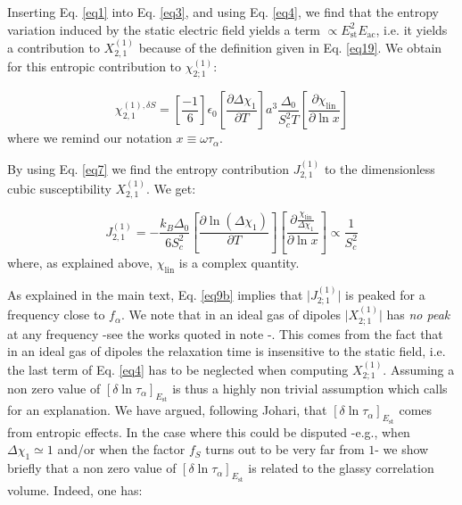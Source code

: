 \documentclass[single column,pre]{revtex4}
\begin{document}

Inserting Eq. \ref{eq1} into Eq. \ref{eq3}, and using Eq. \ref{eq4}, we find that the entropy variation induced by the static electric field yields a term $\propto E_{\text{st}}^2 E_{\text{ac}}$, 
i.e. it yields a contribution to $X_{2,1}^{(1)}$ because of the definition given in Eq. \ref{eq19}. 
We obtain for this entropic contribution to $\chi_{2;1}^{(1)}$: 

\begin{equation}
\chi_{2,1}^{(1),\delta S} = \left[ \frac{-1}{6} \right] \epsilon_0 \left[ \frac{\partial \Delta \chi_1}{\partial T} \right] a^3 \frac{{\Delta_0}}{S_c^2 T} \left[ \frac{\partial \chi_{\text{lin}}}{\partial \ln{x}} \right]
\label{eq7}
\end{equation}
where we remind our notation $x \equiv \omega \tau_{\alpha}$.

By using Eq. \ref{eq7} we find the entropy contribution $J_{2,1}^{(1)}$ to the dimensionless cubic susceptibility $X_{2,1}^{(1)}$. We get:

\begin{equation}
J_{2,1}^{(1)} = -\frac{{k_B \Delta_0}}{6S_c^2} \left[\frac{\partial \ln{(\Delta \chi_1)}}{\partial T}\right] \left[ \frac{ \partial \frac{\chi_{\text{lin}}}{\Delta \chi_1} }{\partial \ln{x}}\right] \propto \frac{1}{S_c^2}
\label{eq9b}
\end{equation}
where, as explained above, $\chi_{\text{lin}}$ is a complex quantity. 

As explained in the main text, Eq. \ref{eq9b} implies that $\vert J_{2;1}^{(1)} \vert$ is peaked for a frequency close to $f_{\alpha}$. We note that in an ideal 
gas of dipoles $\vert X_{2;1}^{(1)} \vert$ has \textit{no peak} at any frequency -see the works quoted in note \cite{note1}-. This comes from the fact that in an ideal gas of dipoles the relaxation time is insensitive 
to the static field, i.e. the last term of Eq. \ref{eq4} has to be neglected when computing $X_{2;1}^{(1)}$. Assuming a non zero 
value of $\left[ \delta \ln{\tau_{\alpha}} \right]_{E_{\text{st}}}$ is thus a highly non trivial assumption which calls for an explanation. We have argued, following Johari, 
that $\left[ \delta \ln{\tau_{\alpha}} \right]_{E_{\text{st}}}$ comes from entropic effects. In the case where this could be disputed -e.g., when $\Delta \chi_1 \simeq 1$ and/or when the factor $f_S$ turns out to be very far from $1$- we show briefly that a non zero value of $\left[ \delta \ln{\tau_{\alpha}} \right]_{E_{\text{st}}}$ is related to the glassy correlation volume. Indeed, one has:
\end{document}
